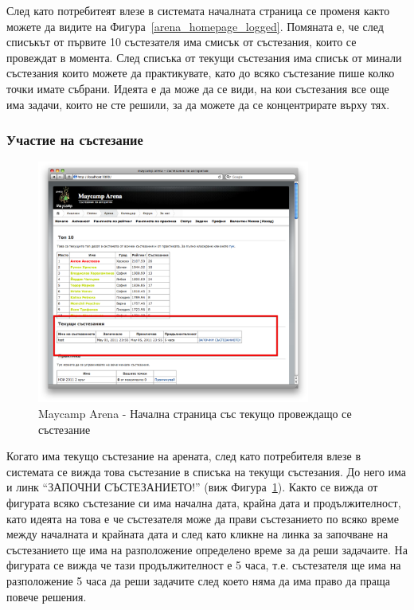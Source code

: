 \documentclass[a4paper,12pt]{article}
\begin{document}
  След като потребитеят влезе в системата началната страница се променя както можете да видите на Фигура~\ref{arena_homepage_logged}. Помяната е, че след списъкът от първите 10 състезателя има смисък от състезания, които се провеждат в момента. След списъка от текущи състезания има списък от минали състезания които можете да практикувате, като до всяко състезание пише колко точки имате събрани. Идеята е да може да се види, на кои състезания все още има задачи, които не сте решили, за да можете да се концентрирате върху тях.
  
  \pagebreak

  \subsubsection{Участие на състезание}
  
  \begin{figure}[ht]
    \begin{center}
      \includegraphics[width=0.8\textwidth]{maycamp_arena_home_contest.png}
    \end{center}
    \caption{Maycamp Arena - Начална страница със текущо провеждащо се състезание}
    \label{arena_homepage_contest}
  \end{figure}
  
  Когато има текущо състезание на арената, след като потребителя влезе в системата се вижда това състезание в списъка на текущи състезания. До него има и линк ``ЗАПОЧНИ СЪСТЕЗАНИЕТО!'' (виж Фигура~\ref{arena_homepage_contest}). Както се вижда от фигурата всяко състезание си има начална дата, крайна дата и продължителност, като идеята на това е че състезателя може да прави състезанието по всяко време между началната и крайната дата и след като кликне на линка за започване на състезанието ще има на разположение определено време за да реши задачаите. На фигурата се вижда че тази продължителност е 5 часа, т.е. състезателя ще има на разположение 5 часа да реши задачите след което няма да има право да праща повече решения.
  
\end{document}
